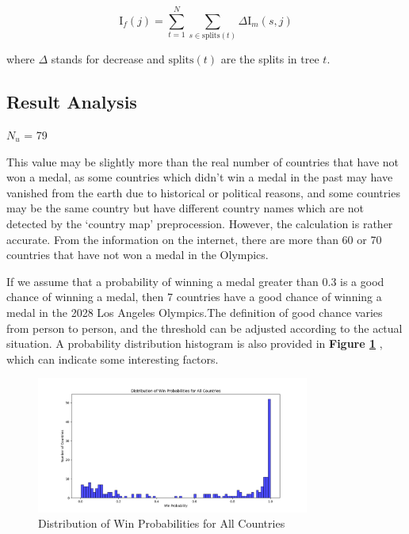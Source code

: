 $$\text{I}_{f}(j) = \sum_{t=1}^{N} \sum_{s \in \text{splits}(t)} \Delta \text{I}_{m}(s,j)  $$

where $\Delta$ stands for decrease and $\text{splits}(t)$ are the splits in tree $t$.\cite{martin2017predicting}

\subsection{Result Analysis}
\begin{center}
    $N_u$ = 79
\end{center}

This value may be slightly more than the real number of countries that have not won a medal, as some countries which didn't win a medal in the past may have vanished from the earth due to historical or political reasons, and some countries may be the same country but have different country names which are not detected by the `country map' preprocession. However, the calculation is rather accurate. From the information on the internet, there are more than 60 or 70 countries that have not won a medal in the Olympics.

If we assume that a probability of winning a medal greater than 0.3 is a good chance of winning a medal, then 7 countries have a good chance of winning a medal in the 2028 Los Angeles Olympics.The definition of good chance varies from person to person, and the threshold can be adjusted according to the actual situation. A probability distribution histogram is also provided in \textbf{Figure \ref{fig:win_probability_distribution}} , which can indicate some interesting factors.


\begin{figure}[h]
    \centering
    \includegraphics[width=0.8\textwidth]{../figures/win_probability_distribution.png}
    \caption{Distribution of Win Probabilities for All Countries}
    \label{fig:win_probability_distribution}
\end{figure}

